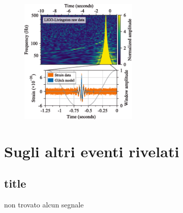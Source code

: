 \begin{figure}
	\vspace{-15pt}
	\begin{center}
		\includegraphics[width=0.5\textwidth]{figures/Capitolo_2/signal.png}
	\end{center}
	\vspace{-5pt}
	\caption{\cite{Abbott_2017b}}
	\label{fig:signalInspiral}
	\vspace{-10pt}
\end{figure}
\section{Sugli altri eventi rivelati}
\subsection*{title}

non trovato alcun segnale\cite{Abbott_2017a}